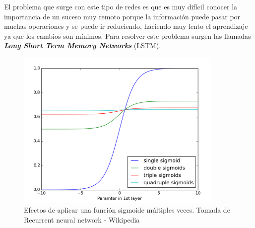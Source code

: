 \documentclass[12pt,spanish]{article}
\begin{document}
	El problema que surge con este tipo de redes es que es muy difícil conocer la importancia de un suceso muy remoto porque la información puede pasar por muchas operaciones y se puede ir reduciendo, haciendo muy lento el aprendizaje ya que los cambios son mínimos. Para resolver este problema surgen las llamadas \textbf{\textit{Long Short Term Memory Networks}} (LSTM).
	\begin{figure}[H]
		\centering
		\includegraphics[width=10cm]{Imagenes/sigmoid_vanishing_gradient.png}
		\begin{centering}
			\caption{Efectos de aplicar una función sigmoide múltiples veces. Tomada de Recurrent neural network - Wikipedia}
		\end{centering}
	\end{figure}
\end{document}
